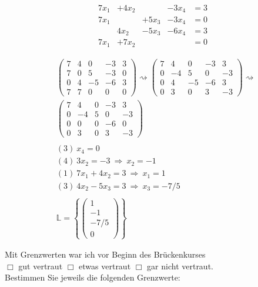 \documentclass[12pt,answers]{exam}
\begin{document}
\begin{questions}
\[\begin{array}{rrrrl}
7 x_1 &+ 4 x_2 &~      &-3 x_4 &=3 \\
7 x_1 &~       &+5 x_3 &-3 x_4 &=0 \\
~     &4   x_2 &-5 x_3 &-6 x_4 &=3 \\
7 x_1 &+ 7 x_2 &~      &~      &=0
\end{array}\]
\begin{solution}
\begin{align*}
&
\left(\begin{array}{rrrr|r}
7 & 4 & 0 & -3 & 3\\
7 & 0 & 5 & -3 & 0\\
0 & 4 & -5 & -6 & 3\\
7 & 7 & 0 & 0 & 0
\end{array} \right)
\rightsquigarrow
\left(\begin{array}{rrrr|r}
7 & 4 & 0 & -3 & 3\\
0 & -4 & 5 & 0 & -3\\
0 & 4 & -5 & -6 & 3\\
0 & 3 & 0 & 3 & -3
\end{array} \right)
\rightsquigarrow
\\
&
\left(\begin{array}{rrrr|r}
7 & 4 & 0 & -3 & 3\\
0 & -4 & 5 & 0 & -3\\
0 & 0 & 0 & -6 & 0\\
0 & 3 & 0 & 3 & -3
\end{array} \right)
\\ \\
&(3)\ x_4=0
\\
&(4)\ 3x_2=-3\ \Rightarrow\ x_2=-1
\\
&(1)\ 7x_1+4x_2=3\ \Rightarrow\ x_1=1
\\
&(3)\ 4x_2-5x_3=3\ \Rightarrow\ x_3=-7/5
\\ \\
& \mathbb{L}=\left\{ \begin{pmatrix}1\\-1\\-7/5\\0\end{pmatrix} \right\}
\end{align*}
\end{solution}
\pagebreak
{}

Mit Grenzwerten war ich vor Beginn des Brückenkurses\\ $\Box$ gut vertraut \hfill $\Box$ etwas vertraut \hfill $\Box$ gar nicht vertraut. \\[2ex]
Bestimmen Sie jeweils die folgenden Grenzwerte:\\
\begin{solution}
\begin{parts}


\end{parts}
\end{solution}
\end{questions}
\end{document}

